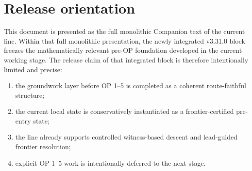 \section{Release orientation}
This document is presented as the full monolithic Companion text of the current line. Within that full monolithic presentation, the newly integrated v3.31.0 block freezes the mathematically relevant pre-OP foundation developed in the current working stage. The release claim of that integrated block is therefore intentionally limited and precise:
\begin{enumerate}[leftmargin=2em]
  \item the groundwork layer before OP 1--5 is completed as a coherent route-faithful structure;
  \item the current local state is conservatively instantiated as a frontier-certified pre-entry state;
  \item the line already supports controlled witness-based descent and lead-guided frontier resolution;
  \item explicit OP 1--5 work is intentionally deferred to the next stage.
\end{enumerate}

